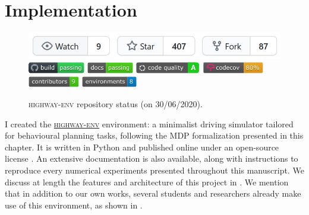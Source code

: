 \section{Implementation}

\begin{figure}[ht]
	\centering
	\includegraphics[width=0.6\linewidth]{img/he-git}\\
	\includegraphics[height=0.5cm]{img/he-buil.pdf}
	\includegraphics[height=0.5cm]{img/he-docs.pdf}
	\includegraphics[height=0.5cm]{img/he-qual.pdf}
	\includegraphics[height=0.5cm]{img/he-cov.pdf}
	\includegraphics[height=0.5cm]{img/he-contr.pdf}
	\includegraphics[height=0.5cm]{img/he-envs.pdf}
	\caption{\textsc{highway-env} repository status (on 30/06/2020).}
	\label{fig:highway-env-status}
\end{figure}

I created the \href{https://github.com/eleurent/highway-env}{\textsc{highway-env}} environment: a minimalist driving simulator tailored for behavioural planning tasks, following the \ac*{MDP} formalization presented in this chapter. It is written in Python and published online under an open-source license \citep{highway-env}. An extensive documentation is also available, along with instructions to reproduce every numerical experiments presented throughout this manuscript. We discuss at length the features and architecture of this project in . We mention that in addition to our own works, several students and researchers already make use of this environment, as shown in .

